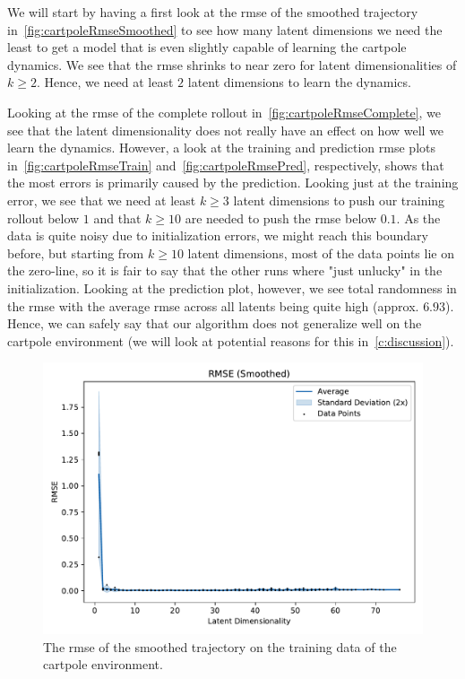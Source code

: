 			We will start by having a first look at the \ac{rmse} of the smoothed trajectory in~\autoref{fig:cartpoleRmseSmoothed} to see how many latent dimensions we need the least to get a model that is even slightly capable of learning the cartpole dynamics. We see that the \ac{rmse} shrinks to near zero for latent dimensionalities of \( k \geq 2 \). Hence, we need at least \(2\) latent dimensions to learn the dynamics.

			Looking at the \ac{rmse} of the complete rollout in~\autoref{fig:cartpoleRmseComplete}, we see that the latent dimensionality does not really have an effect on how well we learn the dynamics. However, a look at the training and prediction \ac{rmse} plots in~\autoref{fig:cartpoleRmseTrain} and~\autoref{fig:cartpoleRmsePred}, respectively, shows that the most errors is primarily caused by the prediction. Looking just at the training error, we see that we need at least \( k \geq 3 \) latent dimensions to push our training rollout below \(1\) and that \( k \geq 10 \) are needed to push the \ac{rmse} below \(0.1\). As the data is quite noisy due to initialization errors, we might reach this boundary before, but starting from \(k \geq 10\) latent dimensions, most of the data points lie on the zero-line, so it is fair to say that the other runs where "just unlucky" in the initialization. Looking at the prediction plot, however, we see total randomness in the \ac{rmse} with the average \ac{rmse} across all latents being quite high (approx. \( 6.93 \)). Hence, we can safely say that our algorithm does not generalize well on the cartpole environment (we will look at potential reasons for this in~\autoref{c:discussion}).

			\begin{figure}
				\centering
				\includegraphics[width=0.7\linewidth]{figures/results/cartpole-gym/latent-dim/comparison-rmse-smoothed-mean-vs-latent-dim.pdf}
				\caption{The \ac{rmse} of the smoothed trajectory on the training data of the cartpole environment.}
				\label{fig:cartpoleRmseSmoothed}
			\end{figure}

